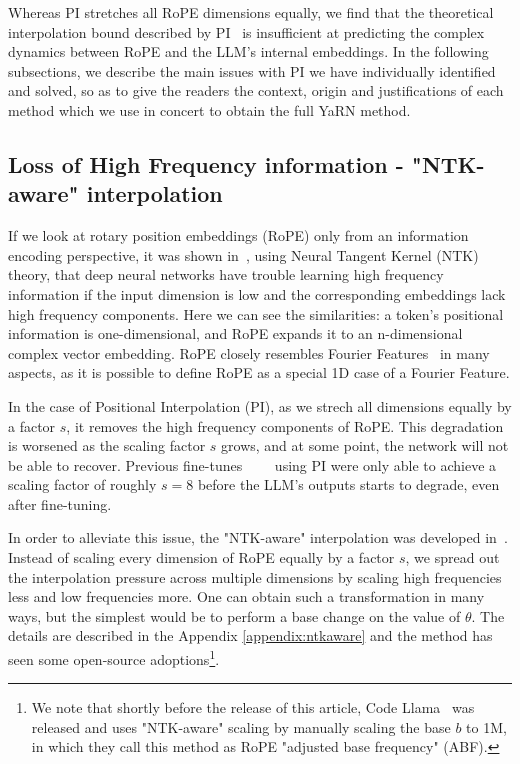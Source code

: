 Whereas PI stretches all RoPE dimensions equally, we find that the theoretical interpolation bound described by PI~\citep{chen2023extending} is insufficient at predicting the complex dynamics between RoPE and the LLM's internal embeddings. In the following subsections, we describe the main issues with PI we have individually identified and solved, so as to give the readers the context, origin and justifications of each method which we use in concert to obtain the full YaRN method.

\subsection{Loss of High Frequency information - "NTK-aware" interpolation}\label{sec:ntkaware} 

If we look at rotary position embeddings (RoPE) only from an information encoding perspective, it was shown in~\citep{tancik2020fourier}, using Neural Tangent Kernel (NTK) theory, that deep neural networks have trouble learning high frequency information if the input dimension is low and the corresponding embeddings lack high frequency components. Here we can see the similarities: a token's positional information is one-dimensional, and RoPE expands it to an n-dimensional complex vector embedding. RoPE closely resembles Fourier Features~\citep{tancik2020fourier} in many aspects, as it is possible to define RoPE as a special 1D case of a Fourier Feature.

In the case of Positional Interpolation (PI), as we strech all dimensions equally by a factor $s$, it removes the high frequency components of RoPE. This degradation is worsened as the scaling factor $s$ grows, and at some point, the network will not be able to recover. Previous fine-tunes~\citep{kaiokendev}~\citep{chen2023extending}~\citep{together}~\citep{llongma} using PI were only able to achieve a scaling factor of roughly $s=8$ before the LLM's outputs starts to degrade, even after fine-tuning.

In order to alleviate this issue, the "NTK-aware" interpolation was developed in~\citep{blocntkaware}. Instead of scaling every dimension of RoPE equally by a factor $s$, we spread out the interpolation pressure across multiple dimensions by scaling high frequencies less and low frequencies more. One can obtain such a transformation in many ways, but the simplest would be to perform a base change on the value of $\theta$. The details are described in the Appendix \ref{appendix:ntkaware} and the method has seen some open-source adoptions\footnote{We note that shortly before the release of this article, Code Llama~\citep{rozière2023code} was released and uses "NTK-aware" scaling by manually scaling the base $b$ to 1M, in which they call this method as RoPE "adjusted base frequency" (ABF).}.

